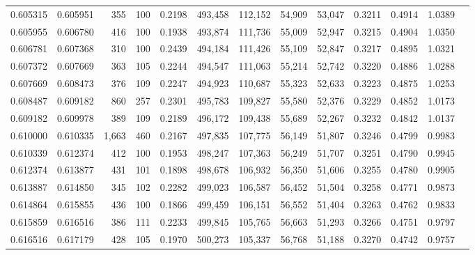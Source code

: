 \begin{tabular}{rrrrrrrrrrrrr}
0.605315 & 0.605951 &   355 & 100 &                                     0.2198 & 493,458 & 112,152 &  54,909 &  53,047 & 0.3211 & 0.4914 & 1.0389 \\
0.605955 & 0.606780 &   416 & 100 &                                     0.1938 & 493,874 & 111,736 &  55,009 &  52,947 & 0.3215 & 0.4904 & 1.0350 \\
0.606781 & 0.607368 &   310 & 100 &                                     0.2439 & 494,184 & 111,426 &  55,109 &  52,847 & 0.3217 & 0.4895 & 1.0321 \\
0.607372 & 0.607669 &   363 & 105 &                                     0.2244 & 494,547 & 111,063 &  55,214 &  52,742 & 0.3220 & 0.4886 & 1.0288 \\
0.607669 & 0.608473 &   376 & 109 &                                     0.2247 & 494,923 & 110,687 &  55,323 &  52,633 & 0.3223 & 0.4875 & 1.0253 \\
0.608487 & 0.609182 &   860 & 257 &                                     0.2301 & 495,783 & 109,827 &  55,580 &  52,376 & 0.3229 & 0.4852 & 1.0173 \\
0.609182 & 0.609978 &   389 & 109 &                                     0.2189 & 496,172 & 109,438 &  55,689 &  52,267 & 0.3232 & 0.4842 & 1.0137 \\
0.610000 & 0.610335 & 1,663 & 460 &                                     0.2167 & 497,835 & 107,775 &  56,149 &  51,807 & 0.3246 & 0.4799 & 0.9983 \\
0.610339 & 0.612374 &   412 & 100 &                                     0.1953 & 498,247 & 107,363 &  56,249 &  51,707 & 0.3251 & 0.4790 & 0.9945 \\
0.612374 & 0.613877 &   431 & 101 &                                     0.1898 & 498,678 & 106,932 &  56,350 &  51,606 & 0.3255 & 0.4780 & 0.9905 \\
0.613887 & 0.614850 &   345 & 102 &                                     0.2282 & 499,023 & 106,587 &  56,452 &  51,504 & 0.3258 & 0.4771 & 0.9873 \\
0.614864 & 0.615855 &   436 & 100 &                                     0.1866 & 499,459 & 106,151 &  56,552 &  51,404 & 0.3263 & 0.4762 & 0.9833 \\
0.615859 & 0.616516 &   386 & 111 &                                     0.2233 & 499,845 & 105,765 &  56,663 &  51,293 & 0.3266 & 0.4751 & 0.9797 \\
0.616516 & 0.617179 &   428 & 105 &                                     0.1970 & 500,273 & 105,337 &  56,768 &  51,188 & 0.3270 & 0.4742 & 0.9757 \\

\end{tabular}
